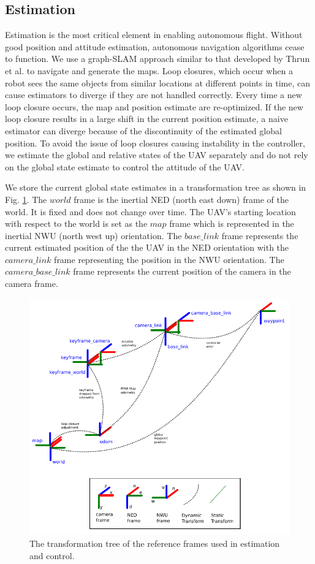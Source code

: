 \documentclass[letterpaper, 10 pt, conference]{ieeeconf}  %
\begin{document}
\subsection{Estimation}

Estimation is the most critical element in enabling autonomous flight. Without good position and attitude estimation, autonomous navigation algorithms cease to function. We use a graph-SLAM approach similar to that developed by Thrun et al. \cite{Thrun2006} to navigate and generate the maps. Loop closures, which occur when a robot sees the same objects from similar locations at different points in time, can cause estimators to diverge if they are not handled correctly. Every time a new loop closure occurs, the map and position estimate are re-optimized. If the new loop closure results in a large shift in the current position estimate, a naive estimator can diverge because of the discontinuity of the estimated global position. To avoid the issue of loop closures causing instability in the controller, we estimate the global and relative states of the UAV separately and do not rely on the global state estimate to control the attitude of the UAV.

We store the current global state estimates in a transformation tree as shown in Fig. \ref{fig:tf_tree}. The $\mathit{world}$ frame is the inertial NED (north east down) frame of the world. It is fixed and does not change over time. The UAV's starting location with respect to the world is set as the $\mathit{map}$ frame which is represented in the inertial NWU (north west up) orientation. The $\mathit{base\_link}$ frame represents the current estimated position of the the UAV in the NED orientation with the $\mathit{camera\_link}$ frame representing the position in the NWU orientation. The $\mathit{camera\_base\_link}$ frame represents the current position of the camera in the camera frame.

\begin{figure}
\centering
\includegraphics[width=0.9\linewidth]{tf_tree_relative_rtab}
\caption{The transformation tree of the reference frames used in estimation and control.}
\label{fig:tf_tree}
\end{figure}
\end{document}
